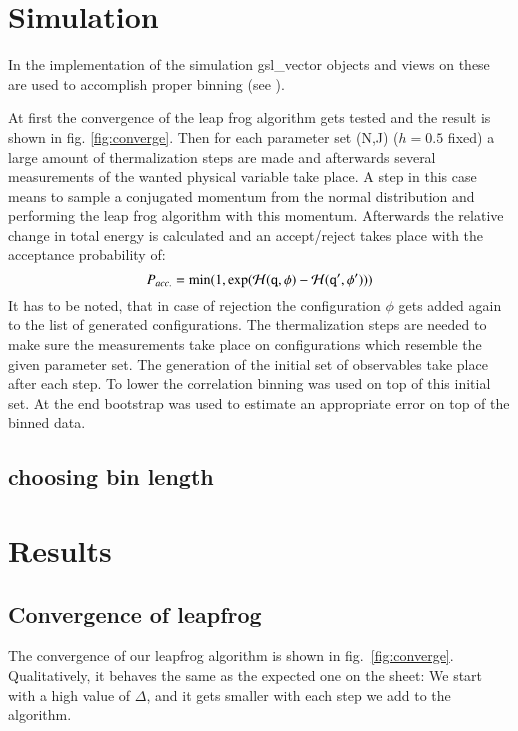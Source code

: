 \documentclass{scrartcl}
\begin{document}
\section{Simulation}
In the implementation of the simulation gsl\_vector objects  and views on these are used to accomplish proper binning (see \cite{gsldoc_mat}). 

At first the convergence of the leap frog algorithm gets tested and the result is shown in fig. \ref{fig:converge}. Then for each parameter set (N,J) ($h=0.5$ fixed) a large amount of thermalization steps are made and afterwards several measurements of the wanted physical variable take place. A step in this case means to sample a conjugated momentum from the normal distribution and performing the leap frog algorithm with this momentum. Afterwards the relative change in total energy is calculated and an accept/reject takes place with the acceptance probability of:
\begin{equation}
	P_{acc.}=\min(1,\exp(\cal{H} (\texttt{q},\phi)-\cal H (\texttt{q}',\phi')))
\end{equation} 
It has to be noted, that in case of rejection the configuration $\phi$ gets added again to the list of generated configurations.
The thermalization steps are needed to make sure the measurements take place on configurations which resemble the given parameter set. The generation of the initial set of observables take place after each step. To lower the correlation binning was used on top of this initial set. At the end bootstrap was used to estimate an appropriate error on top of the binned data.

\subsection{choosing bin length}

\section{Results}

\subsection{Convergence of leapfrog}

The convergence of our leapfrog algorithm is shown in fig.~\ref{fig:converge}. Qualitatively, it behaves the same as the expected one on the sheet: We start with a high value of $\Delta$, and it gets smaller with each step we add to the algorithm. 
\end{document}

